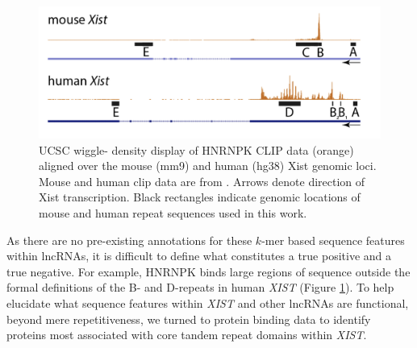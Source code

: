 \begin{figure}[h!]
\centering
\includegraphics[width=\textwidth]{images/hnkmousehuman.png}
\caption[HNRNPK enrichment in human \emph{XIST} and mouse \emph{Xist}.]{UCSC wiggle- density display of HNRNPK CLIP data (orange) aligned over the mouse (mm9) and human (hg38) Xist genomic loci. Mouse and human clip data are from \cite{Cirillo2016QuantitativeEditor,VanNostrand2016RobusteCLIP}. Arrows denote direction of Xist transcription. Black rectangles indicate genomic locations of mouse and human repeat sequences used in this work.}
\label{fig:hnkhumanmouse}
\end{figure}

As there are no pre-existing annotations for these $k$-mer based sequence features within lncRNAs, it is difficult to define what constitutes a true positive and a true negative. For example, HNRNPK binds large regions of sequence outside the formal definitions of the B- and D-repeats in human \textit{XIST} (Figure \ref{fig:hnkhumanmouse}). To help elucidate what sequence features within \emph{XIST} and other lncRNAs are functional, beyond mere repetitiveness, we turned to protein binding data to identify proteins most associated with core tandem repeat domains within \textit{XIST}. 

